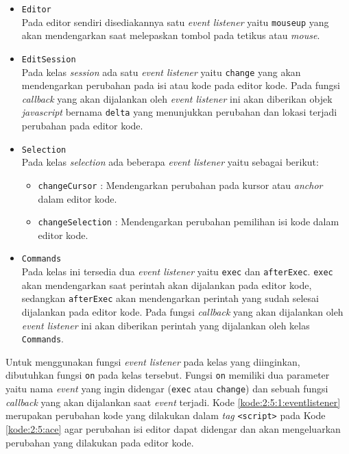 \begin{itemize}
	\item \verb|Editor| \\
	      Pada editor sendiri disediakannya satu \textit{event listener} yaitu \verb|mouseup| yang akan mendengarkan saat melepaskan tombol pada tetikus atau \textit{mouse}.

	\item \verb|EditSession| \\
	      Pada kelas \textit{session} ada satu \textit{event listener} yaitu \verb|change| yang akan mendengarkan perubahan pada isi atau kode pada editor kode. Pada fungsi \textit{callback} yang akan dijalankan oleh \textit{event listener} ini akan diberikan objek \textit{javascript} bernama \verb|delta| yang menunjukkan perubahan dan lokasi terjadi perubahan pada editor kode.

	\item \verb|Selection| \\
	      Pada kelas \textit{selection} ada beberapa \textit{event listener} yaitu sebagai berikut:

	      \begin{itemize}
		      \item \verb|changeCursor| : Mendengarkan perubahan pada kursor atau \textit{anchor} dalam editor kode.
		      \item \verb|changeSelection| : Mendengarkan perubahan pemilihan isi kode dalam editor kode.
	      \end{itemize}

	\item \verb|Commands| \\
	      Pada kelas ini tersedia dua \textit{event listener} yaitu \verb|exec| dan \verb|afterExec|. \verb|exec| akan mendengarkan saat perintah akan dijalankan pada editor kode, sedangkan \verb|afterExec| akan mendengarkan perintah yang sudah selesai dijalankan pada editor kode. Pada fungsi \textit{callback} yang akan dijalankan oleh \textit{event listener} ini akan diberikan perintah yang dijalankan oleh kelas \verb|Commands|.
\end{itemize}

Untuk menggunakan fungsi \textit{event listener} pada kelas yang diinginkan, dibutuhkan fungsi \verb|on| pada kelas tersebut. Fungsi \verb|on| memiliki dua parameter yaitu nama \textit{event} yang ingin didengar (\verb|exec| atau \verb|change|) dan sebuah fungsi \textit{callback} yang akan dijalankan saat \textit{event} terjadi. Kode \ref{kode:2:5:1:eventlistener} merupakan perubahan kode yang dilakukan dalam \textit{tag} \verb|<script>| pada Kode \ref{kode:2:5:ace} agar perubahan isi editor dapat didengar dan akan mengeluarkan perubahan yang dilakukan pada editor kode.

